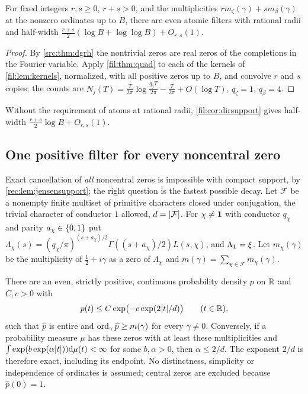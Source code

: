 \begin{corollary}\label{fil:cor:zetabeta}
For fixed integers $r,s\ge0$, $r+s>0$, and the multiplicities $rm_\zeta(\gamma)+sm_\beta(\gamma)$ at the nonzero
ordinates up to $B$, there are even atomic filters with rational radii and half-width
$\frac{r+s}2(\log B+\log\log B)+O_{r,s}(1)$.
\end{corollary}

\begin{proof}
By \cref{src:thm:dgrh} the nontrivial zeros are real zeros of the completions in the Fourier variable. Apply
\cref{fil:thm:quad} to each of the kernels of \cref{fil:lem:kernels}, normalized, with all positive zeros up to
$B$, and convolve $r$ and $s$ copies; the counts are
$N_j(T)=\frac T{2\pi}\log\frac{q_jT}{2\pi}-\frac T{2\pi}+O(\log T)$, $q_\zeta=1$, $q_\beta=4$.
\end{proof}

Without the requirement of atoms at rational radii, \cref{fil:cor:dirsupport} gives half-width
$\frac{r+s}2\log B+O_{r,s}(1)$.

\subsection{One positive filter for every noncentral zero}\label{fil:sec:global}

Exact cancellation of \emph{all} noncentral zeros is impossible with compact support, by
\cref{rec:lem:jensensupport}; the right question is the fastest possible decay. Let $\mathcal F$ be a nonempty
finite multiset of primitive characters closed under conjugation, the trivial character of conductor $1$
allowed, $d=\lvert\mathcal F\rvert$. For $\chi\ne\mathbf{1}$ with conductor $q_\chi$ and parity $a_\chi\in\{0,1\}$ put
$\Lambda_\chi(s)=(q_\chi/\pi)^{(s+a_\chi)/2}\Gamma((s+a_\chi)/2)L(s,\chi)$, and $\Lambda_{\mathbf{1}}=\xi$. Let $m_\chi(\gamma)$
be the multiplicity of $\tfrac12+i\gamma$ as a zero of $\Lambda_\chi$ and $m(\gamma)=\sum_{\chi\in\mathcal F}m_\chi(\gamma)$.

\begin{theorem}\label{fil:thm:global}
There are an even, strictly positive, continuous probability density $p$ on $\mathbb{R}$ and $C,c>0$ with
\[
 p(t)\le C\exp\bigl(-c\exp(2\lvert t\rvert/d)\bigr)\qquad(t\in\mathbb{R}),
\]
such that $\widehat p$ is entire and $\operatorname{ord}_\gamma\widehat p\ge m(\gamma)$ for every $\gamma\ne0$. Conversely, if a probability
measure $\mu$ has these zeros with at least these multiplicities and
$\int\exp(b\exp(\alpha\lvert t\rvert))\mathrm{d}\mu(t)<\infty$ for some $b,\alpha>0$, then $\alpha\le2/d$. The exponent $2/d$ is
therefore exact, including its endpoint. No distinctness, simplicity or independence of ordinates is
assumed; central zeros are excluded because $\widehat p(0)=1$.
\end{theorem}

